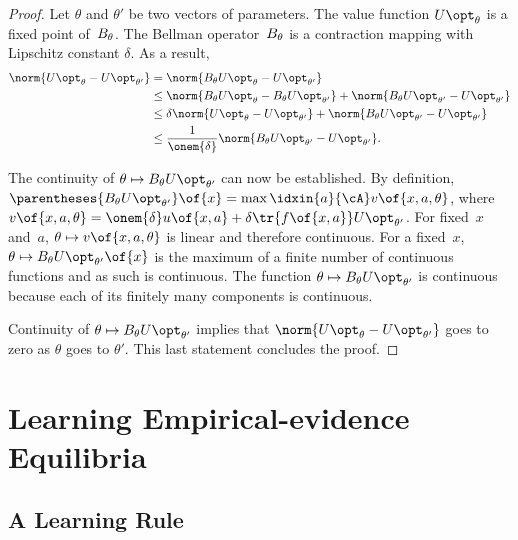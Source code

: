 \begin{proof}
Let \(\theta\) and \(\theta'\) be two vectors of parameters.
The value function \(\Utheta\) is a fixed point of~\(B_{\theta}\). The Bellman operator~\(B_{\theta}\) is a contraction mapping with Lipschitz constant \(\delta\). As a result,
\begin{align*}
\norm{\Utheta - \Uthetap} &= \norm{\Btheta \Utheta - \Uthetap} \\
&\le \norm{\Btheta \Utheta - \Btheta \Uthetap} + \norm{\Btheta\Uthetap - \Uthetap} \\
&\le \delta \norm{\Utheta - \Uthetap} + \norm{\Btheta\Uthetap - \Uthetap} \\
&\le \frac{1}{\onem{\delta}} \norm{\Btheta\Uthetap - \Uthetap}.
\end{align*}

The continuity of \(\theta \mapsto \Btheta \Uthetap\) can now be established.
By definition, \(\parentheses{\Btheta \Uthetap} \of{x} = \max\idxin{a}{\cA} v \of{x, a, \theta}\), where \(v \of{x, a, \theta} = \onem{\delta} u \of{x, a} + \delta \tr{f \of{x, a}} \Uthetap\).
For fixed~\(x\) and~\(a\), \(\theta \mapsto v \of{x, a, \theta}\) is linear and therefore continuous.
For a fixed~\(x\), \(\theta \mapsto \Btheta \Uthetap \of{x}\) is the maximum of a finite number of continuous functions and as such is continuous.
The function \(\theta \mapsto \Btheta \Uthetap\) is continuous because each of its finitely many components is continuous.

Continuity of \(\theta \mapsto \Btheta \Uthetap\) implies that \(\norm{\Utheta - \Uthetap}\) goes to zero as \(\theta\) goes to \(\theta'\).
This last statement concludes the proof.
\end{proof}

\section{Learning Empirical-evidence Equilibria}
\label{sec:learning_empirical_evidence_equilibria}

\subsection{A Learning Rule}

